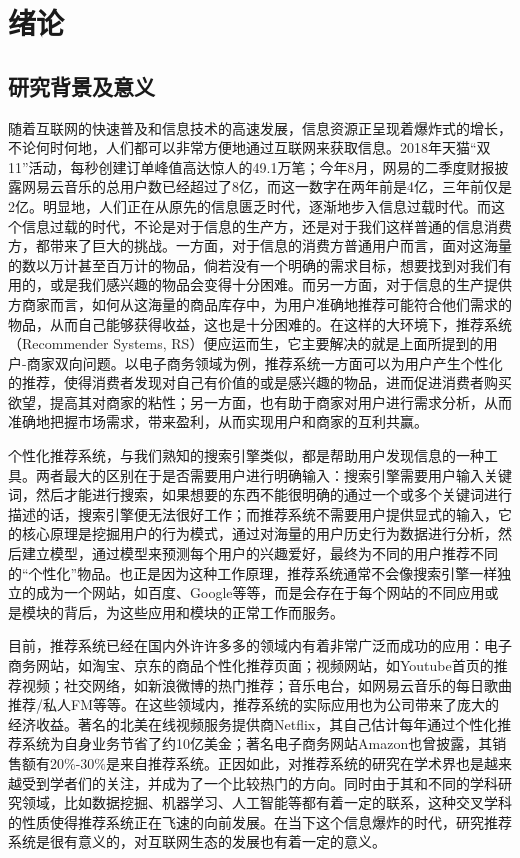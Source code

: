 
\chapter{绪论}
  \section{研究背景及意义}
  随着互联网的快速普及和信息技术的高速发展，信息资源正呈现着爆炸式的增长，不论何时何地，人们都可以非常方便地通过互联网来获取信息。2018年天猫“双11”活动，每秒创建订单峰值高达惊人的49.1万笔；今年8月，网易的二季度财报披露网易云音乐的总用户数已经超过了8亿，而这一数字在两年前是4亿，三年前仅是2亿。明显地，人们正在从原先的信息匮乏时代，逐渐地步入信息过载时代。而这个信息过载的时代，不论是对于信息的生产方，还是对于我们这样普通的信息消费方，都带来了巨大的挑战。一方面，对于信息的消费方普通用户而言，面对这海量的数以万计甚至百万计的物品，倘若没有一个明确的需求目标，想要找到对我们有用的，或是我们感兴趣的物品会变得十分困难。而另一方面，对于信息的生产提供方商家而言，如何从这海量的商品库存中，为用户准确地推荐可能符合他们需求的物品，从而自己能够获得收益，这也是十分困难的。在这样的大环境下，推荐系统（Recommender Systems, RS）便应运而生，它主要解决的就是上面所提到的用户-商家双向问题。以电子商务领域为例，推荐系统一方面可以为用户产生个性化的推荐，使得消费者发现对自己有价值的或是感兴趣的物品，进而促进消费者购买欲望，提高其对商家的粘性；另一方面，也有助于商家对用户进行需求分析，从而准确地把握市场需求，带来盈利\cite{卢棪2016协同过滤推荐系统研究及其应用}，从而实现用户和商家的互利共赢。

  个性化推荐系统，与我们熟知的搜索引擎类似，都是帮助用户发现信息的一种工具。两者最大的区别在于是否需要用户进行明确输入\cite{2012推荐系统实践}：搜索引擎需要用户输入关键词，然后才能进行搜索，如果想要的东西不能很明确的通过一个或多个关键词进行描述的话，搜索引擎便无法很好工作；而推荐系统不需要用户提供显式的输入，它的核心原理是挖掘用户的行为模式，通过对海量的用户历史行为数据进行分析，然后建立模型，通过模型来预测每个用户的兴趣爱好，最终为不同的用户推荐不同的“个性化”物品。也正是因为这种工作原理，推荐系统通常不会像搜索引擎一样独立的成为一个网站，如百度、Google等等，而是会存在于每个网站的不同应用或是模块的背后，为这些应用和模块的正常工作而服务。

  目前，推荐系统已经在国内外许许多多的领域内有着非常广泛而成功的应用：电子商务网站，如淘宝、京东的商品个性化推荐页面；视频网站，如Youtube首页的推荐视频；社交网络，如新浪微博的热门推荐；音乐电台，如网易云音乐的每日歌曲推荐/私人FM等等。在这些领域内，推荐系统的实际应用也为公司带来了庞大的经济收益。著名的北美在线视频服务提供商Netflix，其自己估计每年通过个性化推荐系统为自身业务节省了约10亿美金\cite{gomez2016netflix}；著名电子商务网站Amazon也曾披露，其销售额有20\%-30\%是来自推荐系统。正因如此，对推荐系统的研究在学术界也是越来越受到学者们的关注，并成为了一个比较热门的方向。同时由于其和不同的学科研究领域，比如数据挖掘、机器学习、人工智能等都有着一定的联系，这种交叉学科的性质使得推荐系统正在飞速的向前发展。在当下这个信息爆炸的时代，研究推荐系统是很有意义的，对互联网生态的发展也有着一定的意义。

